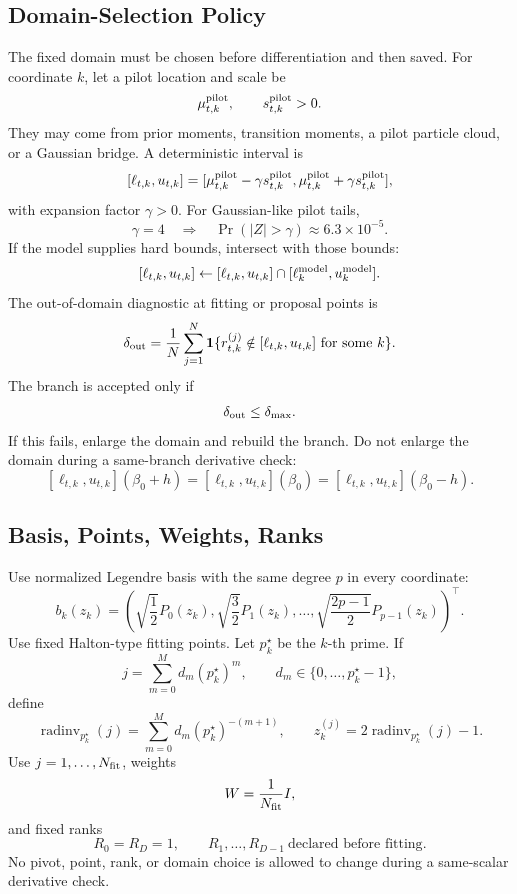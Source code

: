 \documentclass[11pt]{article}
\newcommand{\ind}{\mathbf 1}
\begin{document}
\subsection*{Domain-Selection Policy}

The fixed domain must be chosen before differentiation and then saved.  For
coordinate \(k\), let a pilot location and scale be
\[
    \mu_{t,k}^{\rm pilot},
    \qquad
    s_{t,k}^{\rm pilot}>0.
    \label{eq:p24-p23-dom1}
\]
They may come from prior moments, transition moments, a pilot particle cloud,
or a Gaussian bridge.  A deterministic interval is
\[
    [\ell_{t,k},u_{t,k}]
    =
    [\mu_{t,k}^{\rm pilot}-\gamma s_{t,k}^{\rm pilot},
     \mu_{t,k}^{\rm pilot}+\gamma s_{t,k}^{\rm pilot}],
    \label{eq:p24-p23-dom2}
\]
with expansion factor \(\gamma>0\).  For Gaussian-like pilot tails,
\[
    \gamma=4
    \quad\Rightarrow\quad
    \Pr(|Z|>\gamma)\approx 6.3\times 10^{-5}.
    \label{eq:p24-p23-dom3}
\]
If the model supplies hard bounds, intersect with those bounds:
\[
    [\ell_{t,k},u_{t,k}]
    \leftarrow
    [\ell_{t,k},u_{t,k}]
    \cap
    [\ell_{k}^{\rm model},u_{k}^{\rm model}].
    \label{eq:p24-p23-dom4}
\]
The out-of-domain diagnostic at fitting or proposal points is
\[
    \delta_{\rm out}
    =
    \frac{1}{N}
    \sum_{j=1}^N
    \ind\{r_{t,k}^{(j)}\notin[\ell_{t,k},u_{t,k}]
    \text{ for some }k\}.
    \label{eq:p24-p23-dom5}
\]
The branch is accepted only if
\[
    \delta_{\rm out}\le \delta_{\max}.
    \label{eq:p24-p23-dom6}
\]
If this fails, enlarge the domain and rebuild the branch.  Do not enlarge the
domain during a same-branch derivative check:
\[
    [\ell_{t,k},u_{t,k}](\beta_0+h)
    =
    [\ell_{t,k},u_{t,k}](\beta_0)
    =
    [\ell_{t,k},u_{t,k}](\beta_0-h).
    \label{eq:p24-p23-dom7}
\]

\subsection{Basis, Points, Weights, Ranks}

Use normalized Legendre basis with the same degree \(p\) in every coordinate:
\[
    b_k(z_k)=
    \left(
    \sqrt{\frac12}P_0(z_k),
    \sqrt{\frac32}P_1(z_k),
    \ldots,
    \sqrt{\frac{2p-1}{2}}P_{p-1}(z_k)
    \right)^\top.
    \label{eq:p24-c3}
\]
Use fixed Halton-type fitting points.  Let \(p_k^\star\) be the \(k\)-th prime.
If
\[
    j=\sum_{m=0}^{M}d_m(p_k^\star)^m,\qquad
    d_m\in\{0,\ldots,p_k^\star-1\},
\]
define
\[
    \operatorname{radinv}_{p_k^\star}(j)
    =
    \sum_{m=0}^{M}d_m(p_k^\star)^{-(m+1)},
    \qquad
    z_k^{(j)}=2\operatorname{radinv}_{p_k^\star}(j)-1.
    \label{eq:p24-c4}
\]
Use \(j=1,\ldots,N_{\rm fit}\), weights
\[
    W=\frac1{N_{\rm fit}}I,
    \label{eq:p24-c5}
\]
and fixed ranks
\[
    R_0=R_D=1,\qquad R_1,\ldots,R_{D-1}\ \text{declared before fitting}.
    \label{eq:p24-c6}
\]
No pivot, point, rank, or domain choice is allowed to change during a
same-scalar derivative check.
\end{document}
